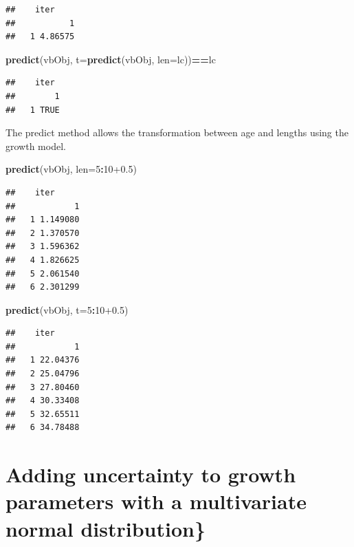 \documentclass[
]{book}
\newenvironment{Shaded}{\begin{snugshade}}{\end{snugshade}}
\newcommand{\AttributeTok}[1]{\textcolor[rgb]{0.13,0.29,0.53}{#1}}
\newcommand{\DecValTok}[1]{\textcolor[rgb]{0.00,0.00,0.81}{#1}}
\newcommand{\FloatTok}[1]{\textcolor[rgb]{0.00,0.00,0.81}{#1}}
\newcommand{\FunctionTok}[1]{\textcolor[rgb]{0.13,0.29,0.53}{\textbf{#1}}}
\newcommand{\NormalTok}[1]{#1}
\newcommand{\SpecialCharTok}[1]{\textcolor[rgb]{0.81,0.36,0.00}{\textbf{#1}}}
\begin{document}
\begin{verbatim}
##    iter
##           1
##   1 4.86575
\end{verbatim}

\begin{Shaded}
\begin{Highlighting}[]
\FunctionTok{predict}\NormalTok{(vbObj, }\AttributeTok{t=}\FunctionTok{predict}\NormalTok{(vbObj, }\AttributeTok{len=}\NormalTok{lc))}\SpecialCharTok{==}\NormalTok{lc}
\end{Highlighting}
\end{Shaded}

\begin{verbatim}
##    iter
##        1
##   1 TRUE
\end{verbatim}

The predict method allows the transformation between age and lengths using the growth model.

\begin{Shaded}
\begin{Highlighting}[]
\FunctionTok{predict}\NormalTok{(vbObj, }\AttributeTok{len=}\DecValTok{5}\SpecialCharTok{:}\DecValTok{10}\FloatTok{+0.5}\NormalTok{)}
\end{Highlighting}
\end{Shaded}

\begin{verbatim}
##    iter
##            1
##   1 1.149080
##   2 1.370570
##   3 1.596362
##   4 1.826625
##   5 2.061540
##   6 2.301299
\end{verbatim}

\begin{Shaded}
\begin{Highlighting}[]
\FunctionTok{predict}\NormalTok{(vbObj, }\AttributeTok{t=}\DecValTok{5}\SpecialCharTok{:}\DecValTok{10}\FloatTok{+0.5}\NormalTok{)}
\end{Highlighting}
\end{Shaded}

\begin{verbatim}
##    iter
##            1
##   1 22.04376
##   2 25.04796
##   3 27.80460
##   4 30.33408
##   5 32.65511
##   6 34.78488
\end{verbatim}

\hypertarget{adding-uncertainty-to-growth-parameters-with-a-multivariate-normal-distribution}{%
\section{Adding uncertainty to growth parameters with a multivariate normal distribution\}}\label{adding-uncertainty-to-growth-parameters-with-a-multivariate-normal-distribution}}
\end{document}
